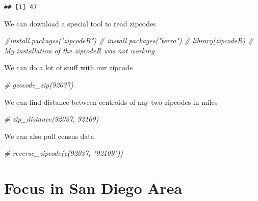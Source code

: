 \documentclass[
]{article}
\newenvironment{Shaded}{\begin{snugshade}}{\end{snugshade}}
\newcommand{\CommentTok}[1]{\textcolor[rgb]{0.56,0.35,0.01}{\textit{#1}}}
\newcommand{\NormalTok}[1]{#1}
\newcommand{\OtherTok}[1]{\textcolor[rgb]{0.56,0.35,0.01}{#1}}
\newcommand{\SpecialCharTok}[1]{\textcolor[rgb]{0.00,0.00,0.00}{#1}}
\newcommand{\StringTok}[1]{\textcolor[rgb]{0.31,0.60,0.02}{#1}}
\begin{document}
\begin{verbatim}
## [1] 47
\end{verbatim}

We can download a special tool to read zipcodes

\begin{Shaded}
\begin{Highlighting}[]
\CommentTok{\#install.packages("zipcodeR")}
\CommentTok{\# install.packages("terra")}
\CommentTok{\# library(zipcodeR) \# My installation of the zipcodeR was not working}
\end{Highlighting}
\end{Shaded}

We can do a lot of stuff with our zipcode

\begin{Shaded}
\begin{Highlighting}[]
\CommentTok{\# geocode\_zip(\textquotesingle{}92037\textquotesingle{})}
\end{Highlighting}
\end{Shaded}

We can find distance between centroids of any two zipcodes in miles

\begin{Shaded}
\begin{Highlighting}[]
\CommentTok{\# zip\_distance(\textquotesingle{}92037\textquotesingle{}, \textquotesingle{}92109\textquotesingle{})}
\end{Highlighting}
\end{Shaded}

We can also pull census data

\begin{Shaded}
\begin{Highlighting}[]
\CommentTok{\# reverse\_zipcode(c(\textquotesingle{}92037\textquotesingle{}, "92109"))}
\end{Highlighting}
\end{Shaded}

\hypertarget{focus-in-san-diego-area}{%
\section{Focus in San Diego Area}\label{focus-in-san-diego-area}}

\begin{Shaded}
\end{Shaded}
\end{document}
